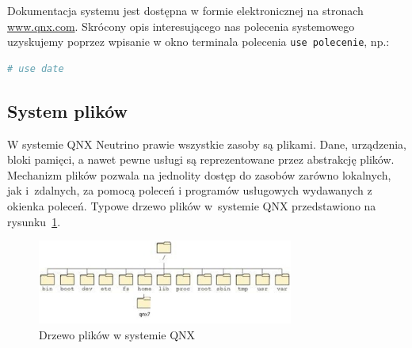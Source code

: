 \documentclass[11pt,twoside,a4paper]{article}
\begin{document}
\begin{example}\label{ex:prostakomenda9} 

Dokumentacja systemu jest dostępna w formie elektronicznej na stronach \href{www.qnx.com}{www.qnx.com}. Skrócony opis interesującego nas polecenia systemowego uzyskujemy poprzez wpisanie w okno terminala polecenia \lstinline{use polecenie}, np.:

\begin{lstlisting}[language=bash]
# use date
\end{lstlisting}
\end{example}

\subsection{System plików} 

W systemie QNX Neutrino prawie wszystkie zasoby są plikami. Dane, urządzenia, bloki pamięci, a nawet pewne usługi są reprezentowane przez abstrakcję plików. Mechanizm plików pozwala na jednolity dostęp do zasobów zarówno lokalnych, jak i~zdalnych, za pomocą poleceń i programów usługowych wydawanych z okienka poleceń. Typowe drzewo plików w~systemie QNX przedstawiono na rysunku~\ref{fig:drzewo}. 

\begin{figure}[!h]
\centering
\includegraphics[width=0.75\textwidth]{img/systemplikow}
\caption{Drzewo plików w systemie QNX}
\label{fig:drzewo}
\end{figure}
\end{document}
